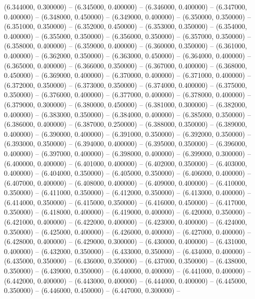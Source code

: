 (6.344000, 0.300000) -- 
(6.345000, 0.400000) -- 
(6.346000, 0.400000) -- 
(6.347000, 0.400000) -- 
(6.348000, 0.450000) -- 
(6.349000, 0.400000) -- 
(6.350000, 0.350000) -- 
(6.351000, 0.350000) -- 
(6.352000, 0.450000) -- 
(6.353000, 0.350000) -- 
(6.354000, 0.400000) -- 
(6.355000, 0.350000) -- 
(6.356000, 0.350000) -- 
(6.357000, 0.350000) -- 
(6.358000, 0.400000) -- 
(6.359000, 0.400000) -- 
(6.360000, 0.350000) -- 
(6.361000, 0.400000) -- 
(6.362000, 0.350000) -- 
(6.363000, 0.450000) -- 
(6.364000, 0.400000) -- 
(6.365000, 0.400000) -- 
(6.366000, 0.350000) -- 
(6.367000, 0.400000) -- 
(6.368000, 0.450000) -- 
(6.369000, 0.400000) -- 
(6.370000, 0.400000) -- 
(6.371000, 0.400000) -- 
(6.372000, 0.350000) -- 
(6.373000, 0.350000) -- 
(6.374000, 0.400000) -- 
(6.375000, 0.350000) -- 
(6.376000, 0.400000) -- 
(6.377000, 0.400000) -- 
(6.378000, 0.400000) -- 
(6.379000, 0.300000) -- 
(6.380000, 0.450000) -- 
(6.381000, 0.300000) -- 
(6.382000, 0.400000) -- 
(6.383000, 0.350000) -- 
(6.384000, 0.400000) -- 
(6.385000, 0.350000) -- 
(6.386000, 0.400000) -- 
(6.387000, 0.250000) -- 
(6.388000, 0.350000) -- 
(6.389000, 0.400000) -- 
(6.390000, 0.400000) -- 
(6.391000, 0.350000) -- 
(6.392000, 0.350000) -- 
(6.393000, 0.350000) -- 
(6.394000, 0.400000) -- 
(6.395000, 0.350000) -- 
(6.396000, 0.400000) -- 
(6.397000, 0.400000) -- 
(6.398000, 0.400000) -- 
(6.399000, 0.300000) -- 
(6.400000, 0.400000) -- 
(6.401000, 0.400000) -- 
(6.402000, 0.350000) -- 
(6.403000, 0.400000) -- 
(6.404000, 0.350000) -- 
(6.405000, 0.350000) -- 
(6.406000, 0.400000) -- 
(6.407000, 0.400000) -- 
(6.408000, 0.400000) -- 
(6.409000, 0.400000) -- 
(6.410000, 0.350000) -- 
(6.411000, 0.350000) -- 
(6.412000, 0.350000) -- 
(6.413000, 0.400000) -- 
(6.414000, 0.350000) -- 
(6.415000, 0.350000) -- 
(6.416000, 0.450000) -- 
(6.417000, 0.350000) -- 
(6.418000, 0.400000) -- 
(6.419000, 0.400000) -- 
(6.420000, 0.350000) -- 
(6.421000, 0.400000) -- 
(6.422000, 0.400000) -- 
(6.423000, 0.400000) -- 
(6.424000, 0.350000) -- 
(6.425000, 0.400000) -- 
(6.426000, 0.400000) -- 
(6.427000, 0.400000) -- 
(6.428000, 0.400000) -- 
(6.429000, 0.300000) -- 
(6.430000, 0.400000) -- 
(6.431000, 0.400000) -- 
(6.432000, 0.350000) -- 
(6.433000, 0.350000) -- 
(6.434000, 0.400000) -- 
(6.435000, 0.350000) -- 
(6.436000, 0.350000) -- 
(6.437000, 0.350000) -- 
(6.438000, 0.350000) -- 
(6.439000, 0.350000) -- 
(6.440000, 0.400000) -- 
(6.441000, 0.400000) -- 
(6.442000, 0.400000) -- 
(6.443000, 0.400000) -- 
(6.444000, 0.400000) -- 
(6.445000, 0.350000) -- 
(6.446000, 0.450000) -- 
(6.447000, 0.300000) -- 
